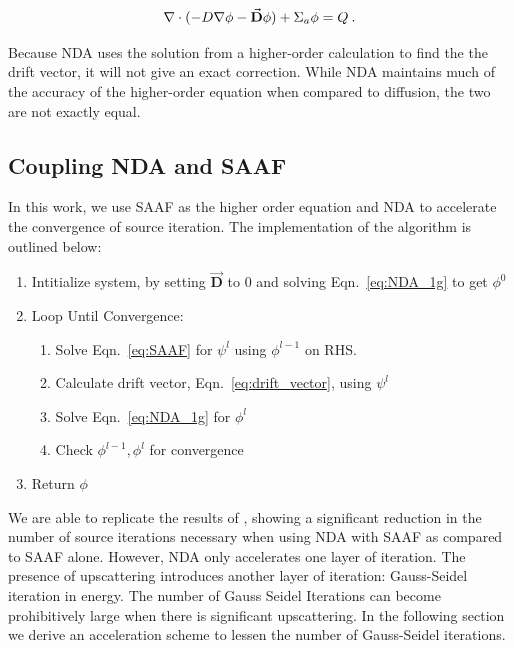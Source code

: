   \begin{equation}
  \nabla\cdot(-D \nabla \phi - \vec{\bf D} \phi) + \Sigma_a \phi = Q \:. \label{eq:NDA_1g}
  \end{equation}
  
Because NDA uses the solution from a higher-order calculation to find the the drift vector, it will not give an exact correction. While NDA maintains much of the accuracy of the higher-order equation when compared to diffusion, the two are not exactly equal. 


\subsection{Coupling NDA and SAAF}
In this work, we use SAAF as the higher order equation and NDA to accelerate the convergence of source iteration. 
The implementation of the algorithm is outlined below:

\begin{enumerate}
    \item Intitialize system, by setting $\vec{\textbf{D}}$ to 0 and solving Eqn.~\eqref{eq:NDA_1g} to get $\phi^0$ 
    \item Loop Until Convergence:
        \begin{enumerate}
            \item Solve Eqn.~\eqref{eq:SAAF} for $\psi^l$ using $\phi^{l-1}$ on RHS.
            \item Calculate drift vector, Eqn.~\eqref{eq:drift_vector}, using $\psi^l$
            \item Solve Eqn.~\eqref{eq:NDA_1g} for $\phi^l$
            \item Check $\phi^{l-1}, \phi^l$ for convergence
        \end{enumerate}
    \item Return $\phi$
\end{enumerate}

We are able to replicate the results of \cite{Wang2013}, showing a significant reduction in the number of source iterations necessary when using NDA with SAAF as compared to SAAF alone. However, NDA only accelerates one layer of iteration. The presence of upscattering introduces another layer of iteration: Gauss-Seidel iteration in energy. The number of Gauss Seidel Iterations can become prohibitively large when there is significant upscattering. In the following section we derive an acceleration scheme to lessen the number of Gauss-Seidel iterations.

